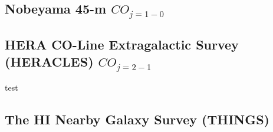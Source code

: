 \subsection{Nobeyama 45-m $CO_{j=1-0}$}

\subsection{HERA CO-Line Extragalactic Survey (HERACLES) $CO_{j=2-1}$}
test
\subsection{The HI Nearby Galaxy Survey (THINGS)}













